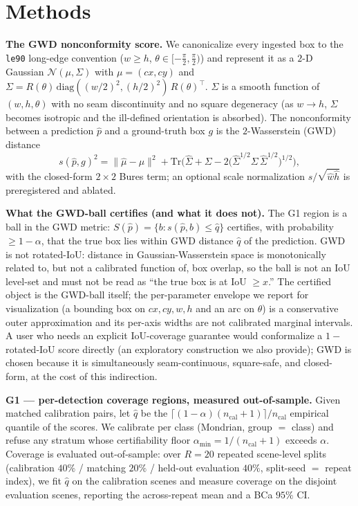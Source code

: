 \documentclass[journal]{IEEEtran}
\begin{document}
\section{Methods}\label{sec:methods}
\textbf{The GWD nonconformity score.} We canonicalize every ingested box to the \texttt{le90} long-edge
convention ($w\ge h$, $\theta\in[-\tfrac{\pi}{2},\tfrac{\pi}{2})$) and represent it as a $2$-D Gaussian
$\mathcal{N}(\mu,\Sigma)$ with $\mu=(cx,cy)$ and $\Sigma = R(\theta)\,\mathrm{diag}((w/2)^2,(h/2)^2)\,
R(\theta)^\top$. $\Sigma$ is a smooth function of $(w,h,\theta)$ with no seam discontinuity and no
square degeneracy (as $w\to h$, $\Sigma$ becomes isotropic and the ill-defined orientation is absorbed). The
nonconformity between a prediction $\hat p$ and a ground-truth box $g$ is the $2$-Wasserstein (GWD) distance
\[
s(\hat p, g)^2 = \lVert \hat\mu-\mu \rVert^2 + \mathrm{Tr}\!\Big(\hat\Sigma+\Sigma-2\big(\hat\Sigma^{1/2}
\Sigma\,\hat\Sigma^{1/2}\big)^{1/2}\Big),
\]
with the closed-form $2\times 2$ Bures term; an optional scale normalization $s/\sqrt{\hat w \hat h}$ is
preregistered and ablated.

\textbf{What the GWD-ball certifies (and what it does not).} The G1 region is a ball in the GWD metric:
$S(\hat p)=\{b: s(\hat p,b)\le\hat q\}$ certifies, with probability $\ge 1-\alpha$, that the true box lies
within GWD distance $\hat q$ of the prediction. GWD is not rotated-IoU: distance in Gaussian-Wasserstein
space is monotonically related to, but not a calibrated function of, box overlap, so the ball is not an
IoU level-set and must not be read as ``the true box is at IoU $\ge x$.'' The certified object is the GWD-ball
itself; the per-parameter envelope we report for visualization (a bounding box on $cx,cy,w,h$ and an arc on
$\theta$) is a conservative outer approximation and its per-axis widths are not calibrated marginal
intervals. A user who needs an explicit IoU-coverage guarantee would conformalize a $1-$rotated-IoU score
directly (an exploratory construction we also provide); GWD is chosen because it is simultaneously
seam-continuous, square-safe, and closed-form, at the cost of this indirection.

\textbf{G1 --- per-detection coverage regions, measured out-of-sample.} Given matched calibration pairs, let
$\hat q$ be the $\lceil(1-\alpha)(n_{\mathrm{cal}}+1)\rceil/n_{\mathrm{cal}}$ empirical quantile of the scores.
We calibrate per class (Mondrian, group $=$ class) and refuse any stratum whose certifiability floor
$\alpha_{\min}=1/(n_{\mathrm{cal}}+1)$ exceeds $\alpha$. Coverage is evaluated out-of-sample: over
$R{=}20$ repeated scene-level splits (calibration $40\%$ / matching $20\%$ / held-out evaluation $40\%$,
split-seed $=$ repeat index), we fit $\hat q$ on the calibration scenes and measure
coverage on the disjoint evaluation scenes, reporting the across-repeat mean and a BCa $95\%$ CI.
\end{document}
